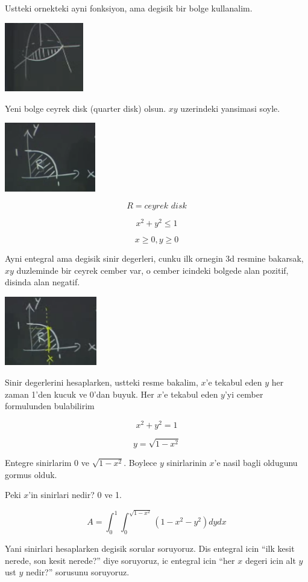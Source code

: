 \documentclass[12pt,fleqn]{article}
\begin{document}
Ustteki ornekteki ayni fonksiyon, ama degisik bir bolge kullanalim. 

\includegraphics[height=3cm]{16_9.png}

Yeni bolge ceyrek disk (quarter disk) olsun. $xy$ uzerindeki yansimasi
soyle. 

\includegraphics[height=3cm]{16_10.png}

\[ R = \textit{ceyrek disk}  \]

\[ x^2 + y^2 \le 1 \]

\[ x \ge 0, y \ge 0 \]

Ayni entegral ama degisik sinir degerleri, cunku ilk ornegin 3d resmine
bakarsak, $xy$ duzleminde bir ceyrek cember var, o cember icindeki bolgede
alan pozitif, disinda alan negatif. 

\includegraphics[height=3cm]{16_11.png}

Sinir degerlerini hesaplarken, ustteki resme bakalim, $x$'e tekabul eden $y$
her zaman 1'den kucuk ve 0'dan buyuk. Her $x$'e tekabul eden $y$'yi cember
formulunden bulabilirim

\[ x^2 + y^2 =1 \]

\[ y = \sqrt{1-x^2} \]

Entegre sinirlarim 0 ve $\sqrt{1-x^2}$. Boylece $y$ sinirlarinin $x$'e
nasil bagli oldugunu gormus olduk. 

Peki $x$'in sinirlari nedir? 0 ve 1. 

\[ A = \int_0^1 \int_0^{\sqrt{1-x^2}}  (1-x^2-y^2) dy dx \]

Yani sinirlari hesaplarken degisik sorular soruyoruz. Dis entegral icin
``ilk kesit nerede, son kesit nerede?'' diye soruyoruz, ic entegral icin
``her $x$ degeri icin alt $y$ ust $y$ nedir?'' sorusunu soruyoruz. 
\end{document}
